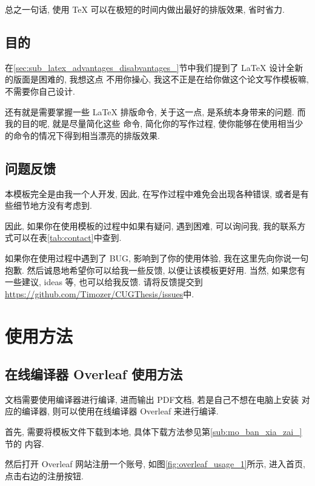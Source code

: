 \documentclass[bibsec, doctor, tabtoc]{cugthesis}
\begin{document}
总之一句话, 使用 \TeX{} 可以在极短的时间内做出最好的排版效果, 省时省力.

\section{目的}
\label{sec:mu_di_}
在\ref{sec:sub_latex_advantages_disabvantages_}节中我们提到了 \LaTeX{} 设计全新的版面是困难的, 我想这点
不用你操心, 我这不正是在给你做这个论文写作模板嘛, 不需要你自己设计.

还有就是需要掌握一些 \LaTeX{} 排版命令, 关于这一点, 是系统本身带来的问题. 而我的目的呢, 就是尽量简化这些
命令, 简化你的写作过程, 使你能够在使用相当少的命令的情况下得到相当漂亮的排版效果.

\section{问题反馈}
\label{sec:wen_ti_fan_kui_}
本模板完全是由我一个人开发, 因此, 在写作过程中难免会出现各种错误, 或者是有些细节地方没有考虑到.

因此, 如果你在使用模板的过程中如果有疑问, 遇到困难, 可以询问我, 我的联系方式可以在表\ref{tab:contact}中查到.

如果你在使用过程中遇到了 BUG, 影响到了你的使用体验, 我在这里先向你说一句抱歉.
然后诚恳地希望你可以给我一些反馈, 以便让该模板更好用. 当然, 如果您有一些建议, ideas 等, 也可以给我反馈.
请将反馈提交到
\url{https://github.com/Timozer/CUGThesis/issues}中.


\chapter{使用方法}

\section{在线编译器 Overleaf 使用方法}
\label{sec:overleaf_usage}

\LaTeXe{} 文档需要使用编译器进行编译, 进而输出 PDF文档, 若是自己不想在电脑上安装
对应的编译器, 则可以使用在线编译器 Overleaf 来进行编译.

首先, 需要将模板文件下载到本地, 具体下载方法参见第\ref{sub:mo_ban_xia_zai_} 节的
内容.

然后打开 Overleaf 网站注册一个账号, 如图\ref{fig:overleaf_usage_1}所示,
进入首页, 点击右边的注册按钮.

\end{document}
